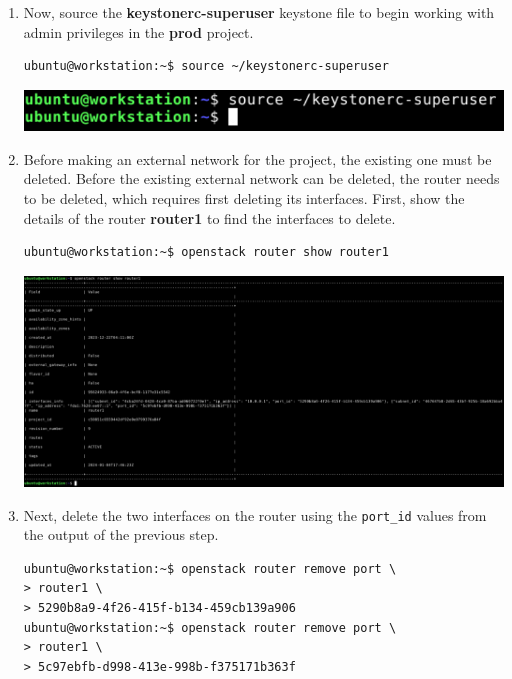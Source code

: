 \documentclass[letterpaper, 12pt]{article}
\begin{document}
\begin{enumerate}
    \item Now, source the \textbf{keystonerc-superuser} keystone file to begin working with admin privileges in the
    \textbf{prod} project.
\begin{lstlisting}
ubuntu@workstation:~$ source ~/keystonerc-superuser
\end{lstlisting}

    \begin{center}
        \includegraphics[width=\linewidth]{images/part1/step12.png}
    \end{center}

    \item Before making an external network for the project, the existing one must be deleted. Before the existing
    external network can be deleted, the router needs to be deleted, which requires first deleting its interfaces.
    First, show the details of the router \textbf{router1} to find the interfaces to delete.
\begin{lstlisting}
ubuntu@workstation:~$ openstack router show router1
\end{lstlisting}

    \begin{center}
        \includegraphics[width=\linewidth]{images/part1/step13.png}
    \end{center}

    \item Next, delete the two interfaces on the router using the \texttt{port\_id} values from the output of the
    previous step.
\begin{lstlisting}
ubuntu@workstation:~$ openstack router remove port \
> router1 \
> 5290b8a9-4f26-415f-b134-459cb139a906
ubuntu@workstation:~$ openstack router remove port \
> router1 \
> 5c97ebfb-d998-413e-998b-f375171b363f
\end{lstlisting}


\end{enumerate}
\end{document}
